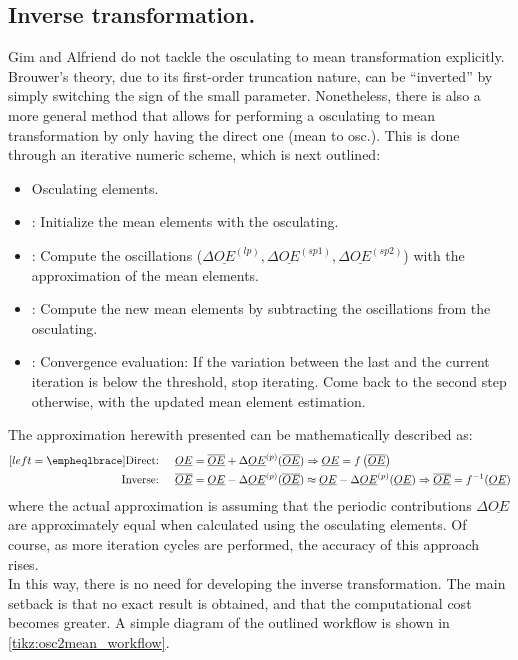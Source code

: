 	\subsection{Inverse transformation.}
	\indent Gim and Alfriend do not tackle the osculating to mean transformation explicitly. Brouwer's theory, due to its first-order truncation nature, can be ``inverted'' by simply switching the sign of the small parameter. Nonetheless, there is also a more general method that allows for performing a osculating to mean transformation by only having the direct one (\ie mean to osc.). This is done through an iterative numeric scheme, which is next outlined:
	\begin{itemize}
	\item[]  Osculating elements.
	\item[\GMVred{\nth{1}}]: Initialize the mean elements with the osculating.
	\item[\GMVred{\nth{2}}]: Compute the oscillations ($\Delta \underline{OE}^{(lp)}, \Delta \underline{OE}^{(sp1)}, \Delta \underline{OE}^{(sp2)}$) with the approximation of the mean elements.
	\item[\GMVred{\nth{3}}]: Compute the new mean elements by subtracting the oscillations from the osculating.
	\item[\GMVred{\nth{4}}]: Convergence evaluation: If the variation between the last and the current iteration is below the threshold, stop iterating. Come back to the second step otherwise, with the updated mean element estimation.
	\end{itemize}
	\indent The approximation herewith presented can be mathematically described as:
	\begin{alignat}{4}[left = \empheqlbrace]
	\text{Direct: \quad} & \underline{OE} = \underline{\overline{OE}} + \Delta \underline{OE}^{(p)} (\underline{\overline{OE}}) \Rightarrow \underline{OE} = f\left( \underline{\overline{OE}}\right) \\
	\text{Inverse: \quad} & \underline{\overline{OE}} = \underline{OE} - \Delta \underline{OE}^{(p)} (\underline{\overline{OE}}) \approx \underline{OE} - \Delta \underline{OE}^{(p)} (\underline{OE}) \Rightarrow \underline{\overline{OE}} = f^{-1}( \underline{OE}) 
	\end{alignat}
	\noindent where the actual approximation is assuming that the periodic contributions $\Delta \underline{OE}$ are approximately equal when calculated using the osculating elements. Of course, as more iteration cycles are performed, the accuracy of this approach rises.\\
	\indent In this way, there is no need for developing the inverse transformation. The main setback is that no exact result is obtained, and that the computational cost becomes greater. A simple diagram of the outlined workflow is shown in \ref{tikz:osc2mean_workflow}.
	
%
